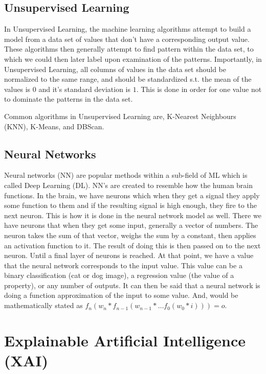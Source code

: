 \subsection{Unsupervised Learning}

In Unsupervised Learning, the machine learning algorithms attempt to build a model from a data set of values that don't have a corresponding output value. These algorithms then generally attempt to find pattern within the data set, to which we could then later label upon examination of the patterns. Importantly, in Unsupervised Learning, all columns of values in the data set should be normalized to the same range, and should be standardized s.t. the mean of the values is $0$ and it's standard deviation is $1$. This is done in order for one value not to dominate the patterns in the data set.

Common algorithms in Unsupervised Learning are, K-Nearest Neighbours (KNN), K-Means\cite{lloyd:kmeans}, and DBScan\cite{ling:dbscan}.

\subsection{Neural Networks}

Neural networks (NN) are popular methods within a sub-field of ML which is called Deep Learning (DL).
NN's are created to resemble how the human brain functions. In the brain, we have neurons which when they get a signal they apply some function to them and if the resulting signal is high enough, they fire to the next neuron. This is how it is done in the neural network model as well.
There we have neurons that when they get some input, generally a vector of numbers. The neuron takes the sum of that vector, weighs the sum by a constant, then applies an activation function to it. The result of doing this is then passed on to the next neuron. Until a final layer of neurons is reached. At that point, we have a value that the neural network corresponds to the input value. This value can be a binary classification (cat or dog image), a regression value (the value of a property), or any number of outputs. It can then be said that a neural network is doing a function approximation of the input to some value. And, would be mathematically stated as $f_n ( w_n * f_{n-1} (w_{n-1} * \dots f_0(w_0*i))) = o$.

\section{Explainable Artificial Intelligence (XAI)}

